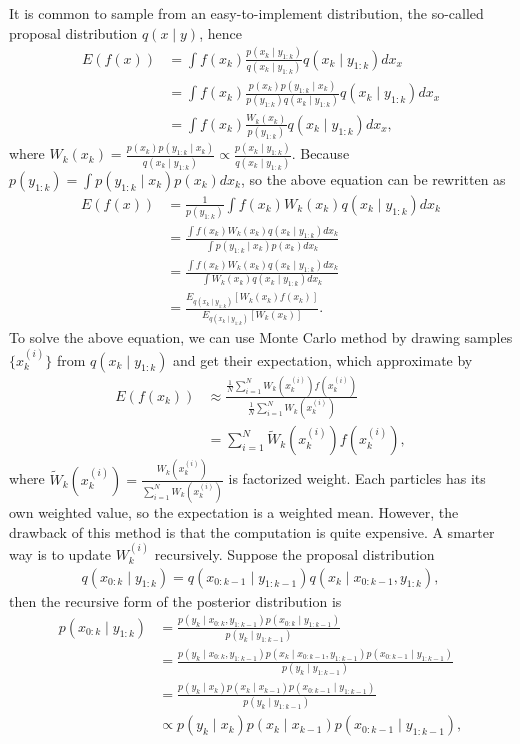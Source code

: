 It is common to sample from an easy-to-implement distribution, the so-called proposal distribution $q(x\mid y)$, hence
\begin{align*}
E(f(x)) &= \int f(x_k)\frac{p(x_k\mid y_{1:k})}{q(x_k\mid y_{1:k})} q(x_k\mid y_{1:k})dx_x\\
&= \int f(x_k)\frac{p(x_k)p(y_{1:k}\mid x_k)}{p(y_{1:k})q(x_k\mid y_{1:k})} q(x_k\mid y_{1:k})dx_x\\
&= \int f(x_k)\frac{W_k(x_k)}{p(y_{1:k})} q(x_k\mid y_{1:k})dx_x,
\end{align*}
where $W_k(x_k)=\frac{p(x_k)p(y_{1:k}\mid x_k)}{q(x_k\mid y_{1:k})} \propto \frac{p(x_k\mid y_{1:k})}{q(x_k\mid y_{1:k})}$. Because $p(y_{1:k})=\int p(y_{1:k}\mid x_k)p(x_k)dx_k$, so the above equation can be rewritten as
\begin{align*}
E(f(x)) &= \frac{1}{p(y_{1:k})}\int f(x_k)W_k(x_k)q(x_k\mid y_{1:k})dx_k\\
&= \frac{ \int f(x_k)W_k(x_k)q(x_k\mid y_{1:k})dx_k }{\int p(y_{1:k}\mid x_k)p(x_k)dx_k} \\
&= \frac{ \int f(x_k)W_k(x_k)q(x_k\mid y_{1:k})dx_k }{\int W_k(x_k)q(x_k\mid y_{1:k})dx_k} \\
&= \frac{E_{q(x_k\mid y_{1:k})}[W_k(x_k)f(x_k)]}{E_{q(x_k\mid y_{1:k})}[W_k(x_k)]}.
\end{align*}
To solve the above equation, we can use Monte Carlo method by drawing samples $\{x_k^{(i)}\}$ from $q(x_k\mid y_{1:k})$ and get their expectation, which approximate by
\begin{align*}
E(f(x_k)) &\approx \frac{\frac{1}{N} \sum_{i=1}^{N} W_k(x_k^{(i)})f(x_k^{(i)})} {\frac{1}{N} \sum_{i=1}^{N} W_k(x_k^{(i)})}\\
&= \sum_{i=1}^{N} \tilde{W}_k(x_k^{(i)})f(x_k^{(i)}),
\end{align*}
where $\tilde{W}_k(x_k^{(i)}) = \frac{ W_k(x_k^{(i)})}{\sum_{i=1}^NW_k(x_k^{(i)})}$ is factorized weight. Each particles has its own weighted value, so the expectation is a weighted mean. However, the drawback of this method is that the computation is quite expensive. A smarter way is to update $W_k^{(i)}$ recursively. Suppose the proposal distribution 
\begin{align*}
q(x_{0:k}\mid y_{1:k}) = q(x_{0:k-1}\mid y_{1:k-1}) q(x_k\mid  x_{0:k-1},y_{1:k}),
\end{align*}
then the recursive form of the posterior distribution is 
\begin{align*}
p(x_{0:k}\mid y_{1:k}) &= \frac{p(y_k\mid x_{0:k},y_{1:k-1})p(x_{0:k}\mid y_{1:k-1})}{p(y_k\mid y_{1:k-1})}\\
&= \frac{p(y_k\mid x_{0:k},y_{1:k-1}) p(x_k\mid x_{0:k-1},y_{1:k-1}) p(x_{0:k-1}\mid y_{1:k-1} ) }{p(y_k\mid y_{1:k-1})}\\
&= \frac{p(y_k\mid x_k) p(x_k\mid x_{k-1}) p(x_{0:k-1}\mid y_{1:k-1} ) }{p(y_k\mid y_{1:k-1})}\\
&\propto p(y_k\mid x_k) p(x_k\mid x_{k-1}) p(x_{0:k-1}\mid y_{1:k-1} ),
\end{align*}
